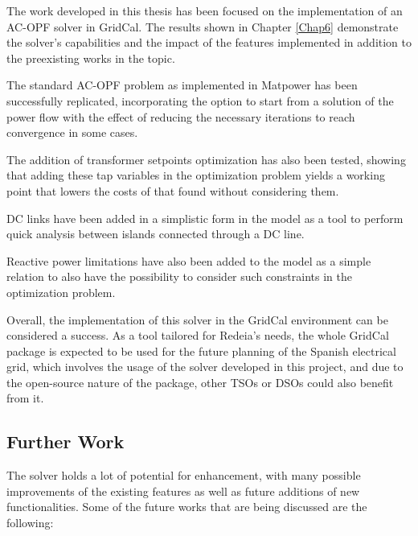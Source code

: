The work developed in this thesis has been focused on the implementation of an AC-OPF solver in GridCal. The results shown in Chapter \ref{Chap6} demonstrate the solver's capabilities
and the impact of the features implemented in addition to the preexisting works in the topic. 

The standard AC-OPF problem as implemented in Matpower has been successfully replicated, incorporating the option to start from a solution of the power flow with the effect of reducing the necessary iterations to reach convergence in some cases. 

The addition of transformer setpoints optimization has also been tested, showing that adding these tap variables in the optimization problem yields a working point that lowers the costs of that found without considering them.

DC links have been added in a simplistic form in the model as a tool to perform quick analysis between islands connected through a DC line.

Reactive power limitations have also been added to the model as a simple relation to also have the possibility to consider such constraints in the optimization problem.

Overall, the implementation of this solver in the GridCal environment can be considered a success. As a tool tailored for Redeia's needs, the whole GridCal package is expected to be used for the future planning of the Spanish 
electrical grid, which involves the usage of the solver developed in this project, and due to the open-source nature of the package, other TSOs or DSOs could also benefit from it. 


\subsection{Further Work}

The solver holds a lot of potential for enhancement, with many possible improvements of the existing features as well as future additions of new functionalities. Some of the 
future works that are being discussed are the following:

